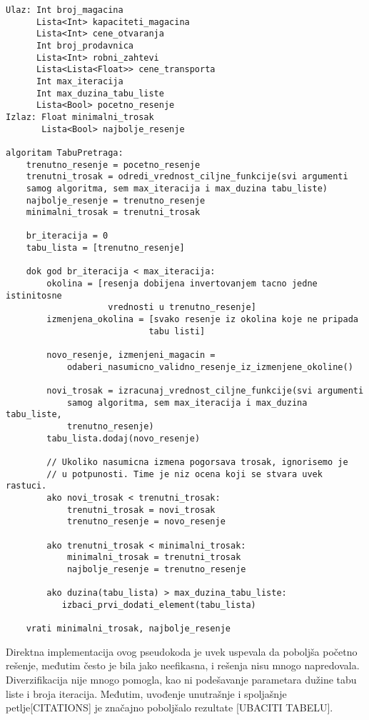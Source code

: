 \documentclass[a4paper]{article}
\begin{document}
\begin{lstlisting}
Ulaz: Int broj_magacina
      Lista<Int> kapaciteti_magacina
      Lista<Int> cene_otvaranja
      Int broj_prodavnica
      Lista<Int> robni_zahtevi
      Lista<Lista<Float>> cene_transporta
      Int max_iteracija
      Int max_duzina_tabu_liste
      Lista<Bool> pocetno_resenje
Izlaz: Float minimalni_trosak
       Lista<Bool> najbolje_resenje

algoritam TabuPretraga:
    trenutno_resenje = pocetno_resenje
    trenutni_trosak = odredi_vrednost_ciljne_funkcije(svi argumenti
    samog algoritma, sem max_iteracija i max_duzina tabu_liste)
    najbolje_resenje = trenutno_resenje
    minimalni_trosak = trenutni_trosak
    
    br_iteracija = 0
    tabu_lista = [trenutno_resenje]
    
    dok god br_iteracija < max_iteracija:
        okolina = [resenja dobijena invertovanjem tacno jedne istinitosne
                    vrednosti u trenutno_resenje]
        izmenjena_okolina = [svako resenje iz okolina koje ne pripada 
                            tabu listi]
        
        novo_resenje, izmenjeni_magacin =
            odaberi_nasumicno_validno_resenje_iz_izmenjene_okoline()
        
        novi_trosak = izracunaj_vrednost_ciljne_funkcije(svi argumenti
            samog algoritma, sem max_iteracija i max_duzina tabu_liste,
            trenutno_resenje)
        tabu_lista.dodaj(novo_resenje)
        
        // Ukoliko nasumicna izmena pogorsava trosak, ignorisemo je
        // u potpunosti. Time je niz ocena koji se stvara uvek rastuci.
        ako novi_trosak < trenutni_trosak:
            trenutni_trosak = novi_trosak
            trenutno_resenje = novo_resenje
        
        ako trenutni_trosak < minimalni_trosak:
            minimalni_trosak = trenutni_trosak
            najbolje_resenje = trenutno_resenje
        
        ako duzina(tabu_lista) > max_duzina_tabu_liste:
           izbaci_prvi_dodati_element(tabu_lista)
            
    vrati minimalni_trosak, najbolje_resenje
\end{lstlisting}

Direktna implementacija ovog pseudokoda je uvek uspevala da poboljša početno rešenje, međutim često je bila jako neefikasna, i rešenja nisu mnogo napredovala. Diverzifikacija nije mnogo pomogla, kao ni podešavanje parametara dužine tabu liste i broja iteracija. Međutim, uvođenje unutrašnje i spoljašnje petlje[CITATIONS] je značajno poboljšalo rezultate [UBACITI TABELU]. 
\end{document}
